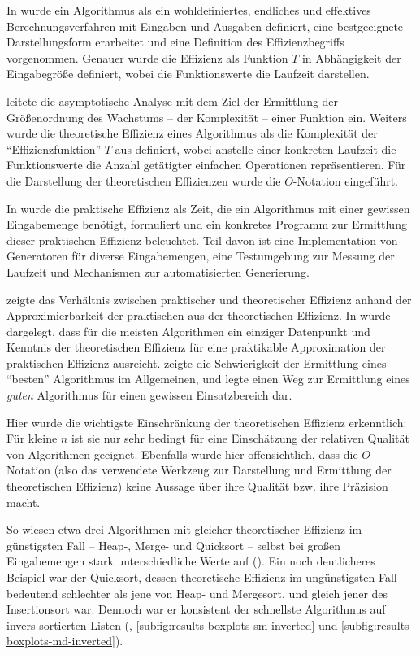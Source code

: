 In  wurde ein Algorithmus als ein wohldefiniertes, endliches und effektives Berechnungsverfahren mit Eingaben und Ausgaben definiert, eine bestgeeignete Darstellungsform erarbeitet und eine Definition des Effizienzbegriffs vorgenommen. Genauer wurde die Effizienz als Funktion $T$ in Abhängigkeit der Eingabegröße definiert, wobei die Funktionswerte die Laufzeit darstellen.

 leitete die asymptotische Analyse mit dem Ziel der Ermittlung der Größenordnung des Wachstums -- der Komplexität -- einer Funktion ein. Weiters wurde die theoretische Effizienz eines Algorithmus als die Komplexität der \enquote{Effizienzfunktion} $T$ aus  definiert, wobei anstelle einer konkreten Laufzeit die Funktionswerte die Anzahl getätigter einfachen Operationen repräsentieren. Für die Darstellung der theoretischen Effizienzen wurde die $O$-Notation eingeführt.

In  wurde die praktische Effizienz als Zeit, die ein Algorithmus mit einer gewissen Eingabemenge benötigt, formuliert und ein konkretes Programm zur Ermittlung dieser praktischen Effizienz beleuchtet. Teil davon ist eine Implementation von Generatoren für diverse Eingabemengen, eine Testumgebung zur Messung der Laufzeit und Mechanismen zur automatisierten Generierung.

 zeigte das Verhältnis zwischen praktischer und theoretischer Effizienz anhand der Approximierbarkeit der praktischen aus der theoretischen Effizienz. In  wurde dargelegt, dass für die meisten Algorithmen ein einziger Datenpunkt und Kenntnis der theoretischen Effizienz für eine praktikable Approximation der praktischen Effizienz ausreicht.  zeigte die Schwierigkeit der Ermittlung eines \enquote{besten} Algorithmus im Allgemeinen, und legte einen Weg zur Ermittlung eines \emph{guten} Algorithmus für einen gewissen Einsatzbereich dar.

Hier wurde die wichtigste Einschränkung der theoretischen Effizienz erkenntlich: Für kleine $n$ ist sie nur sehr bedingt für eine Einschätzung der relativen Qualität von Algorithmen geeignet. Ebenfalls wurde hier offensichtlich, dass die $O$-Notation (also das verwendete Werkzeug zur Darstellung und Ermittlung der theoretischen Effizienz) keine Aussage über ihre Qualität bzw. ihre Präzision macht.

So wiesen etwa drei Algorithmen mit gleicher theoretischer Effizienz im günstigsten Fall -- Heap-, Merge- und Quicksort -- selbst bei großen Eingabemengen stark unterschiedliche Werte auf (). Ein noch deutlicheres Beispiel war der Quicksort, dessen theoretische Effizienz im ungünstigsten Fall bedeutend schlechter als jene von Heap- und Mergesort, und gleich jener des Insertionsort war. Dennoch war er konsistent der schnellste Algorithmus auf invers sortierten Listen (, \ref{subfig:results-boxplots-sm-inverted} und \ref{subfig:results-boxplots-md-inverted}).
